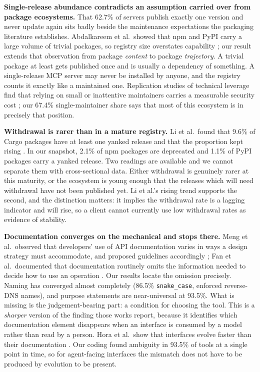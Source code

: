 \documentclass[a4paper,fleqn]{cas-dc}
\begin{document}
\textbf{Single-release abundance contradicts an assumption carried over from
package ecosystems.} That 62.7\% of servers publish exactly one version and
never update again sits badly beside the maintenance expectations the packaging
literature establishes. Abdalkareem et al.\ showed that npm and PyPI carry a
large volume of trivial packages, so registry size overstates capability
\citep{abdalkareem2020}; our result extends that observation from package
\emph{content} to package \emph{trajectory}. A trivial package at least gets
published once and is usually a dependency of something. A single-release MCP
server may never be installed by anyone, and the registry counts it exactly like
a maintained one. Replication studies of technical leverage find that relying on
small or inattentive maintainers carries a measurable security cost
\citep{samaana2025}; our 67.4\% single-maintainer share says that most of this
ecosystem is in precisely that position.

\textbf{Withdrawal is rarer than in a mature registry.} Li et al.\ found that
9.6\% of Cargo packages have at least one yanked release and that the proportion
kept rising \citep{li2023yanked}. In our snapshot, 2.1\% of npm packages are
deprecated and 1.1\% of PyPI packages carry a yanked release. Two readings are
available and we cannot separate them with cross-sectional data. Either
withdrawal is genuinely rarer at this maturity, or the ecosystem is young enough
that the releases which will need withdrawal have not been published yet. Li et
al.'s rising trend supports the second, and the distinction matters: it implies
the withdrawal rate is a lagging indicator and will rise, so a client cannot
currently use low withdrawal rates as evidence of stability.

\textbf{Documentation converges on the mechanical and stops there.} Meng et
al.\ observed that developers' use of API documentation varies in ways a design
strategy must accommodate, and proposed guidelines accordingly
\citep{meng2019apidoc}; Fan et al.\ documented that documentation routinely
omits the information needed to decide how to use an operation
\citep{fan2020apidoc}. Our results locate the omission precisely. Naming has
converged almost completely (86.5\% \texttt{snake\_case}, enforced reverse-DNS
names), and purpose statements are near-universal at 93.5\%. What is missing is
the judgement-bearing part: a condition for choosing the tool. This is a
\emph{sharper} version of the finding those works report, because it identifies
which documentation element disappears when an interface is consumed by a model
rather than read by a person. Hora et al.\ show that interfaces evolve faster
than their documentation \citep{hora2016apievolution}. Our coding found
ambiguity in 93.5\% of tools at a single point in time, so for agent-facing
interfaces the mismatch does not have to be produced by evolution to be
present.
\end{document}
